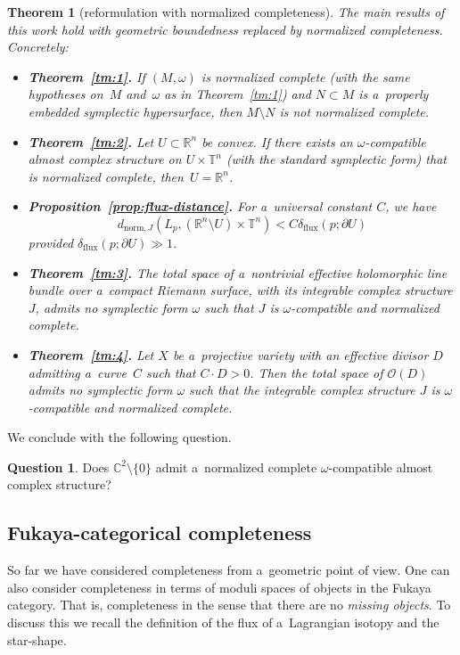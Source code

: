 \documentclass[pdftex]{sigma}
\numberwithin{equation}{section}
\newcommand{\bC}{{\mathbb C}}
\newcommand{\bR}{{\mathbb R}}
\newcommand{\bT}{{\mathbb T}}
\newtheorem{tm}[Theorem]{Theorem}
\theoremstyle{definition}
\newtheorem{ques}[Theorem]{Question}
\begin{document}
\begin{tm}[reformulation with normalized completeness]\label{tm:norm-complete-reformulation}
The main results of this work hold with geometric boundedness replaced by normalized completeness. Concretely:
\begin{itemize}\itemsep=0pt
\item {\bf Theorem~\ref{tm:1}.} If $(M,\omega)$ is normalized complete {\rm(}with the same hypotheses on~$M$ and~$\omega$ as in Theorem~{\rm\ref{tm:1})} and $N\subset M$ is a~properly embedded symplectic hypersurface, then $M\setminus N$ is not normalized complete.
\item {\bf Theorem~\ref{tm:2}.} Let $U\subset\bR^n$ be convex. If there exists an $\omega$-compatible almost complex structure on $U\times\bT^n$ {\rm(}with the standard symplectic form{\rm)} that is normalized complete, then~${U=\bR^n}$.
\item {\bf Proposition~\ref{prop:flux-distance}.} For a~universal constant $C$, we have
\[%
d_{\mathrm{norm},J}(L_p,(\bR^n\setminus U)\times\bT^n) <C\delta_{\mathrm{flux}}(p;\partial U)
\]
provided $\delta_{\mathrm{flux}}(p;\partial U)\gg 1$.
\item {\bf Theorem~\ref{tm:3}.} The total space of a~nontrivial effective holomorphic line bundle over a~compact Riemann surface, with its integrable complex structure $J$, admits no symplectic form $\omega$ such that $J$ is $\omega$-compatible and normalized complete.
\item {\bf Theorem~\ref{tm:4}.} Let $X$ be a~projective variety with an effective divisor $D$ admitting a~curve~$C$ such that $C\cdot D>0$. Then the total space of $\mathcal{O}(D)$ admits no symplectic form $\omega$ such that the integrable complex structure $J$ is $\omega$-compatible and normalized complete.
\end{itemize}
\end{tm}


We conclude with the following question.

\begin{ques}
 Does $\bC^2\setminus\{0\}$ admit a~normalized complete $\omega$-compatible almost complex structure?
 \end{ques}


\subsection{Fukaya-categorical completeness}\label{subsec:fukaya-complete}
So far we have considered completeness from a~geometric point of view.
One can also consider completeness in terms of moduli spaces of objects in the Fukaya category. That is, completeness in the sense that there are no \emph{missing objects}. To discuss this we recall the definition of the flux of a~Lagrangian isotopy and the star-shape.
\end{document}
